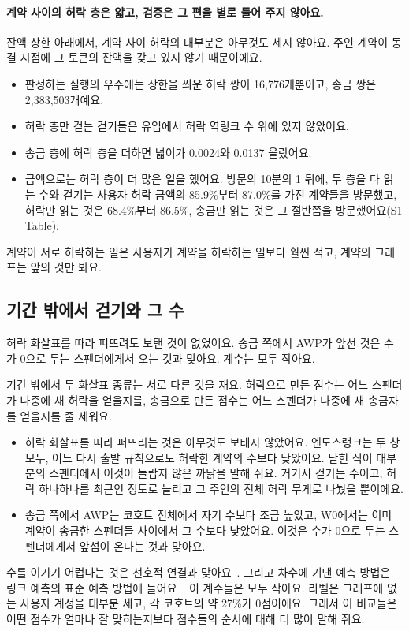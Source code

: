 \paragraph{계약 사이의 허락 층은 얇고, 검증은 그 편을 별로 들어 주지 않아요.}
잔액 상한 아래에서, 계약 사이 허락의 대부분은 아무것도 세지 않아요. 주인 계약이 동결 시점에 그 토큰의 잔액을 갖고 있지 않기 때문이에요.
\begin{itemize}
\item 판정하는 실행의 우주에는 상한을 씌운 허락 쌍이 16,776개뿐이고, 송금 쌍은 2,383,503개예요.
\item 허락 층만 걷는 걷기들은 유입에서 허락 역링크 수 위에 있지 않았어요.
\item 송금 층에 허락 층을 더하면 넓이가 0.0024와 0.0137 올랐어요.
\item 금액으로는 허락 층이 더 많은 일을 했어요. 방문의 10분의 1 뒤에, 두 층을 다 읽는 수와 걷기는 사용자 허락 금액의 85.9\%부터 87.0\%를 가진 계약들을 방문했고, 허락만 읽는 것은 68.4\%부터 86.5\%, 송금만 읽는 것은 그 절반쯤을 방문했어요(S1 Table).
\end{itemize}
계약이 서로 허락하는 일은 사용자가 계약을 허락하는 일보다 훨씬 적고, 계약의 그래프는 앞의 것만 봐요.

\subsection{기간 밖에서 걷기와 그 수}

\begin{yoji}
허락 화살표를 따라 퍼뜨려도 보탠 것이 없었어요. 송금 쪽에서 AWP가 앞선 것은 수가 0으로 두는 스펜더에게서 오는 것과 맞아요. 계수는 모두 작아요.
\end{yoji}

기간 밖에서 두 화살표 종류는 서로 다른 것을 재요. 허락으로 만든 점수는 어느 스펜더가 나중에 새 허락을 얻을지를, 송금으로 만든 점수는 어느 스펜더가 나중에 새 송금자를 얻을지를 줄 세워요.
\begin{itemize}
\item 허락 화살표를 따라 퍼뜨리는 것은 아무것도 보태지 않았어요. 엔도스랭크는 두 창 모두, 어느 다시 출발 규칙으로도 허락한 계약의 수보다 낮았어요. 닫힌 식이 대부분의 스펜더에서 이것이 놀랍지 않은 까닭을 말해 줘요. 거기서 걷기는 수이고, 허락 하나하나를 최근인 정도로 늘리고 그 주인의 전체 허락 무게로 나눴을 뿐이에요.
\item 송금 쪽에서 AWP는 코호트 전체에서 자기 수보다 조금 높았고, W0에서는 이미 계약이 송금한 스펜더들 사이에서 그 수보다 낮았어요. 이것은 수가 0으로 두는 스펜더에게서 앞섬이 온다는 것과 맞아요.
\end{itemize}
수를 이기기 어렵다는 것은 선호적 연결과 맞아요~\cite{barabasi1999scaling}. 그리고 차수에 기댄 예측 방법은 링크 예측의 표준 예측 방법에 들어요~\cite{libennowell2007link}. 이 계수들은 모두 작아요. 라벨은 그래프에 없는 사용자 계정을 대부분 세고, 각 코호트의 약 27\%가 0점이에요. 그래서 이 비교들은 어떤 점수가 얼마나 잘 맞히는지보다 점수들의 순서에 대해 더 많이 말해 줘요.

